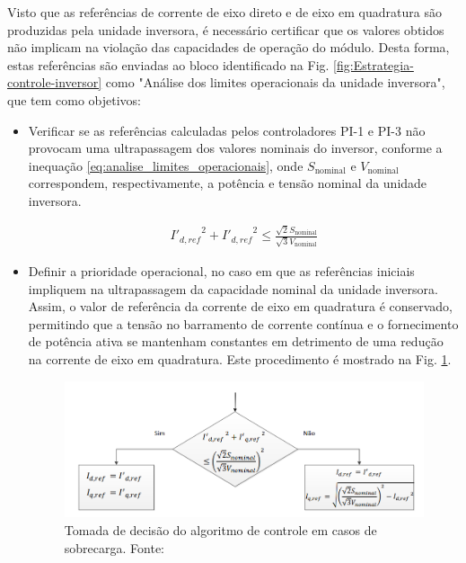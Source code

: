 Visto que as referências de corrente de eixo direto e de eixo em quadratura são produzidas pela unidade inversora, é necessário certificar que os valores obtidos não implicam na violação das capacidades de operação do módulo. Desta forma, estas referências são enviadas ao bloco identificado na Fig. \ref{fig:Estrategia-controle-inversor} como "Análise dos limites operacionais da unidade inversora", que tem como objetivos:

\begin{itemize}
	\item Verificar se as referências calculadas pelos controladores PI-1 e PI-3 não provocam uma ultrapassagem dos valores nominais do inversor, conforme a inequação \ref{eq:analise_limites_operacionais}, onde $S_{\textrm{nominal}}$ e $V_{\textrm{nominal}}$ correspondem, respectivamente, a potência e tensão nominal da unidade inversora.
	
	\begin{align}\label{eq:analise_limites_operacionais}
	{I'_{d,ref}}^2 + {I'_{d,ref}}^2 \leq \frac{\sqrt{2}S_{\textrm{nominal}}}{\sqrt{3}V_{\textrm{nominal}}}
	\end{align}
	
	\item Definir a prioridade operacional, no caso em que as referências iniciais impliquem na ultrapassagem da capacidade nominal da unidade inversora. Assim, o valor de referência da corrente de eixo em quadratura é conservado, permitindo que a tensão no barramento de corrente contínua e o fornecimento de potência ativa se mantenham constantes em detrimento de uma redução na corrente de eixo em quadratura. Este procedimento é mostrado na Fig. \ref{fig:Mecanisco_Sobrecarga}.
	
	\begin{figure}[!hbt]
		\begin{center}
			\includegraphics[width=\columnwidth]{figuras/Mecanisco_Sobrecarga.PNG}
			\caption{Tomada de decisão do algoritmo de controle em casos de sobrecarga. Fonte: \cite{TeseProfAlex}}
			\label{fig:Mecanisco_Sobrecarga}
		\end{center}
	\end{figure}
	

\end{itemize}
